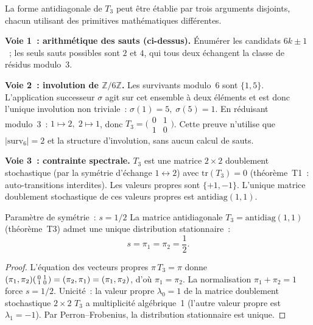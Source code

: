 \documentclass[12pt,a4paper]{article}
\begin{document}
\begin{remarque}[Trois voies indépendantes vers $T_3 = \mathrm{antidiag}(1,1)$]
\label{rem:T3_three_routes}
La forme antidiagonale de $T_3$ peut être établie par trois arguments
disjoints, chacun utilisant des primitives mathématiques différentes.

\smallskip\noindent
\textbf{Voie 1~: arithmétique des sauts (ci-dessus).}
Énumérer les candidats $6k \pm 1$~; les seuls sauts possibles sont
$2$ et $4$, qui tous deux échangent la classe de résidus modulo~3.

\smallskip\noindent
\textbf{Voie 2~: involution de $\mathbb{Z}/6\mathbb{Z}$.}
Les survivants modulo~$6$ sont $\{1, 5\}$. L'application successeur
$\sigma$ agit sur cet ensemble à deux éléments et est donc l'unique
involution non triviale~: $\sigma(1) = 5,\; \sigma(5) = 1$. En réduisant
modulo~3~: $1 \mapsto 2,\; 2 \mapsto 1$, donc
$T_3 = \bigl(\begin{smallmatrix} 0 & 1 \\ 1 & 0 \end{smallmatrix}\bigr)$.
Cette preuve n'utilise que $|\mathrm{surv}_6| = 2$ et la structure
d'involution, sans aucun calcul de sauts.

\smallskip\noindent
\textbf{Voie 3~: contrainte spectrale.}
$T_3$ est une matrice $2 \times 2$ doublement stochastique (par la
symétrie d'échange $1 \leftrightarrow 2$) avec
$\mathrm{tr}(T_3) = 0$ (théorème~T1~: auto-transitions interdites).
Les valeurs propres sont $\{+1, -1\}$. L'unique matrice doublement
stochastique de ces valeurs propres est $\mathrm{antidiag}(1,1)$.
\end{remarque}

\mTHM
\begin{thmbox}{Paramètre de symétrie~: $s = 1/2$}
\label{thm:s_half}
La matrice antidiagonale $T_3 = \mathrm{antidiag}(1,1)$ (théorème~T3)
admet une unique distribution stationnaire~:
\begin{equation}
  s = \pi_1 = \pi_2 = \frac{1}{2}.
  \label{eq:s_half}
\end{equation}

\begin{proof}
L'équation des vecteurs propres $\pi\,T_3 = \pi$ donne
$(\pi_1, \pi_2) \begin{psmallmatrix} 0 & 1 \\ 1 & 0 \end{psmallmatrix}
= (\pi_2, \pi_1) = (\pi_1, \pi_2)$,
d'où $\pi_1 = \pi_2$. La normalisation $\pi_1 + \pi_2 = 1$ force
$s = 1/2$. Unicité~: la valeur propre $\lambda_0 = 1$ de la matrice
doublement stochastique $2 \times 2$ $T_3$ a multiplicité algébrique~1
(l'autre valeur propre est $\lambda_1 = -1$). Par Perron--Frobenius,
la distribution stationnaire est unique.
\end{proof}
\end{thmbox}
\end{document}
